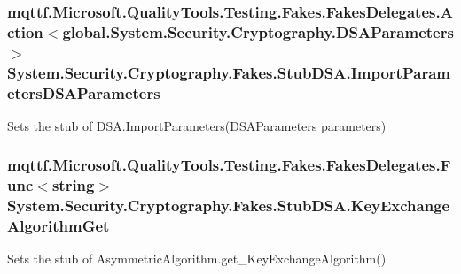 \hypertarget{class_system_1_1_security_1_1_cryptography_1_1_fakes_1_1_stub_d_s_a_ac08dd8b2511de536e3da5fb36838f152}{
\subsubsection[{Import\-Parameters\-D\-S\-A\-Parameters}]{\setlength{\rightskip}{0pt plus 5cm}mqttf.\-Microsoft.\-Quality\-Tools.\-Testing.\-Fakes.\-Fakes\-Delegates.\-Action$<$global.\-System.\-Security.\-Cryptography.\-D\-S\-A\-Parameters$>$ System.\-Security.\-Cryptography.\-Fakes.\-Stub\-D\-S\-A.\-Import\-Parameters\-D\-S\-A\-Parameters}}\label{class_system_1_1_security_1_1_cryptography_1_1_fakes_1_1_stub_d_s_a_ac08dd8b2511de536e3da5fb36838f152}


Sets the stub of D\-S\-A.\-Import\-Parameters(\-D\-S\-A\-Parameters parameters)

\hypertarget{class_system_1_1_security_1_1_cryptography_1_1_fakes_1_1_stub_d_s_a_a2d708bd7ad625ce60176340778afaacb}{
\subsubsection[{Key\-Exchange\-Algorithm\-Get}]{\setlength{\rightskip}{0pt plus 5cm}mqttf.\-Microsoft.\-Quality\-Tools.\-Testing.\-Fakes.\-Fakes\-Delegates.\-Func$<$string$>$ System.\-Security.\-Cryptography.\-Fakes.\-Stub\-D\-S\-A.\-Key\-Exchange\-Algorithm\-Get}}\label{class_system_1_1_security_1_1_cryptography_1_1_fakes_1_1_stub_d_s_a_a2d708bd7ad625ce60176340778afaacb}


Sets the stub of Asymmetric\-Algorithm.\-get\-\_\-\-Key\-Exchange\-Algorithm()

